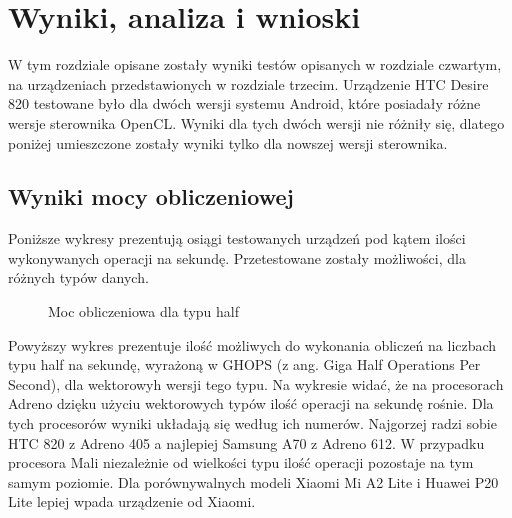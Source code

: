 \section[Wyniki, analiza i wnioski]{Wyniki, analiza i wnioski}
W tym rozdziale opisane zostały wyniki testów opisanych w rozdziale czwartym, na urządzeniach przedstawionych w rozdziale trzecim. Urządzenie HTC Desire 820 testowane było dla dwóch wersji systemu Android, które posiadały różne wersje sterownika OpenCL. Wyniki dla tych dwóch wersji nie różniły się, dlatego poniżej umieszczone zostały wyniki tylko dla nowszej wersji sterownika.
\subsection[Wyniki mocy obliczeniowej]{Wyniki mocy obliczeniowej}
Poniższe wykresy prezentują osiągi testowanych urządzeń pod kątem ilości wykonywanych operacji na sekundę. Przetestowane zostały możliwości, dla różnych typów danych.
\begin{figure}[H]
\caption{Moc obliczeniowa dla typu half}
\end{figure}
Powyższy wykres prezentuje ilość możliwych do wykonania obliczeń na liczbach typu half na sekundę, wyrażoną w GHOPS (z ang. Giga Half Operations Per Second), dla wektorowyh wersji tego typu. Na wykresie widać, że na procesorach Adreno dzięku użyciu wektorowych typów ilość operacji na sekundę rośnie. Dla tych procesorów wyniki układają się według ich numerów. Najgorzej radzi sobie HTC 820 z Adreno 405 a najlepiej Samsung A70 z Adreno 612. W przypadku procesora Mali niezależnie od wielkości typu ilość operacji pozostaje na tym samym poziomie. Dla porównywalnych modeli Xiaomi Mi A2 Lite i Huawei P20 Lite lepiej wpada urządzenie od Xiaomi.

